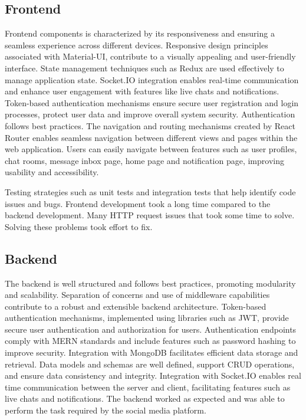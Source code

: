 \subsection{Frontend}
Frontend components is characterized by its responsiveness and ensuring a seamless experience across different devices. Responsive design principles associated with Material-UI, contribute to a visually appealing and user-friendly interface. State management techniques such as Redux are used effectively to manage application state. Socket.IO integration enables real-time communication and enhance user engagement with features like live chats and notifications. Token-based authentication mechanisms ensure secure user registration and login processes, protect user data and improve overall system security. Authentication follows best practices. The navigation and routing mechanisms created by React Router enables seamless navigation between different views and pages within the web application. Users can easily navigate between features such as user profiles, chat rooms, message inbox page, home page and notification page, improving usability and accessibility. 

Testing strategies such as unit tests and integration tests that help identify code issues and bugs. Frontend development took a long time compared to the backend development. Many HTTP request issues that took some time to solve. Solving these problems took effort to fix.

\subsection{Backend}
The backend is well structured and follows best practices, promoting modularity and scalability. Separation of concerns and use of middleware capabilities contribute to a robust and extensible backend architecture. Token-based authentication mechanisms, implemented using libraries such as JWT, provide secure user authentication and authorization for users. Authentication endpoints comply with MERN standards and include features such as password hashing to improve security. Integration with MongoDB facilitates efficient data storage and retrieval. Data models and schemas are well defined, support CRUD operations, and ensure data consistency and integrity. Integration with Socket.IO enables real time communication between the server and client, facilitating features such as live chats and notifications. The backend worked as expected and was able to perform the task required by the social media platform.  

